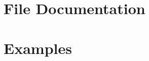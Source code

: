 \documentclass[twoside]{book}
\newcommand{\+}{\discretionary{\mbox{\scriptsize$\hookleftarrow$}}{}{}}
\newcommand{\clearemptydoublepage}{%
    \newpage{\pagestyle{empty}\cleardoublepage}%
  }
\begin{document}
\chapter{File Documentation}








\chapter{Examples}

  \backmatter
  \newpage
  \clearemptydoublepage
  \printindex
\end{document}
